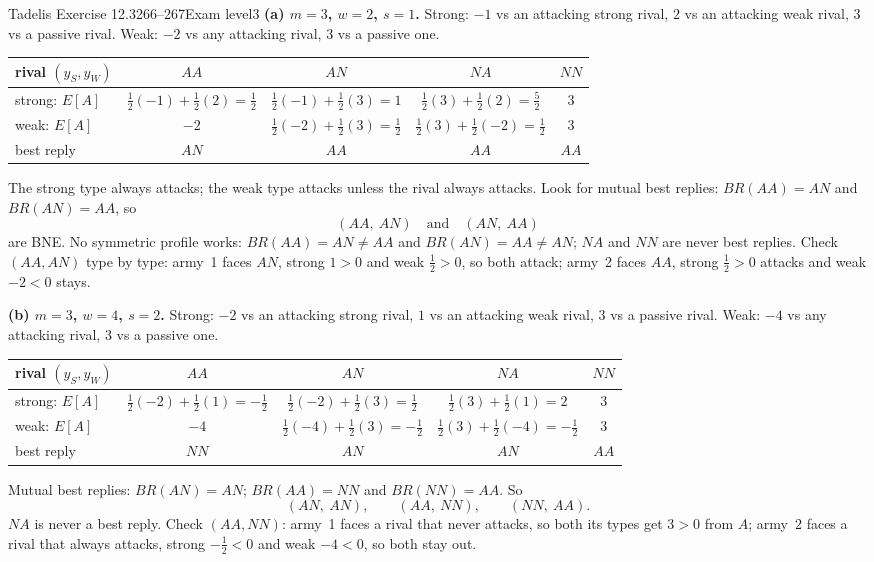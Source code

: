 \begin{exsol}{Tadelis Exercise 12.3}{266--267}{Exam level}{3}
\textbf{(a) $m = 3$, $w = 2$, $s = 1$.} Strong: $-1$ vs an attacking strong rival, $2$ vs an attacking
weak rival, $3$ vs a passive rival. Weak: $-2$ vs any attacking rival, $3$ vs a passive one.
\begin{center}
\begin{tabular}{l|cccc}
rival $(y_S, y_W)$ & $AA$ & $AN$ & $NA$ & $NN$\\\hline
strong: $E[A]$ & $\frac12(-1)+\frac12(2) = \frac12$ & $\frac12(-1)+\frac12(3) = 1$ & $\frac12(3)+\frac12(2) = \frac52$ & $3$\\
weak: $E[A]$ & $-2$ & $\frac12(-2)+\frac12(3) = \frac12$ & $\frac12(3)+\frac12(-2) = \frac12$ & $3$\\\hline
best reply & $AN$ & $AA$ & $AA$ & $AA$
\end{tabular}
\end{center}
The strong type always attacks; the weak type attacks unless the rival always attacks. Look for
mutual best replies: $BR(AA) = AN$ and $BR(AN) = AA$, so
\[
  (AA,\ AN) \quad\text{and}\quad (AN,\ AA)
\]
are BNE. No symmetric profile works: $BR(AA) = AN \ne AA$ and $BR(AN) = AA \ne AN$; $NA$ and $NN$ are
never best replies. Check $(AA, AN)$ type by type: army~1 faces $AN$, strong $1 > 0$ and weak
$\frac12 > 0$, so both attack; army~2 faces $AA$, strong $\frac12 > 0$ attacks and weak $-2 < 0$ stays.

\textbf{(b) $m = 3$, $w = 4$, $s = 2$.} Strong: $-2$ vs an attacking strong rival, $1$ vs an attacking
weak rival, $3$ vs a passive rival. Weak: $-4$ vs any attacking rival, $3$ vs a passive one.
\begin{center}
\begin{tabular}{l|cccc}
rival $(y_S, y_W)$ & $AA$ & $AN$ & $NA$ & $NN$\\\hline
strong: $E[A]$ & $\frac12(-2)+\frac12(1) = -\frac12$ & $\frac12(-2)+\frac12(3) = \frac12$ & $\frac12(3)+\frac12(1) = 2$ & $3$\\
weak: $E[A]$ & $-4$ & $\frac12(-4)+\frac12(3) = -\frac12$ & $\frac12(3)+\frac12(-4) = -\frac12$ & $3$\\\hline
best reply & $NN$ & $AN$ & $AN$ & $AA$
\end{tabular}
\end{center}
Mutual best replies: $BR(AN) = AN$; $BR(AA) = NN$ and $BR(NN) = AA$. So
\[
  (AN,\ AN), \qquad (AA,\ NN), \qquad (NN,\ AA).
\]
$NA$ is never a best reply. Check $(AA, NN)$: army~1 faces a rival that never attacks, so both its
types get $3 > 0$ from $A$; army~2 faces a rival that always attacks, strong $-\frac12 < 0$ and weak
$-4 < 0$, so both stay out.


\end{exsol}
